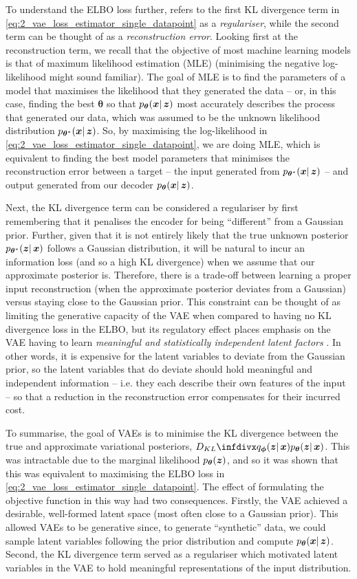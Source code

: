 To understand the ELBO loss further, \cite{variational_bayes} refers to the first KL divergence term in \eqref{eq:2_vae_loss_estimator_single_datapoint} as a \textit{regulariser}, while the second term can be thought of as a \textit{reconstruction error}. Looking first at the reconstruction term, we recall that the objective of most machine learning models is that of maximum likelihood estimation (MLE) (minimising the negative log-likelihood might sound familiar). The goal of MLE is to find the parameters of a model that maximises the likelihood that they generated the data -- or, in this case, finding the best $\boldsymbol{\theta}$ so that $p_{\boldsymbol{\theta}}(\boldsymbol{x} |\, \boldsymbol{z})$ most accurately describes the process that generated our data, which was assumed to be the unknown likelihood distribution $p_{\boldsymbol{\theta}^*}(\boldsymbol{x} |\, \boldsymbol{z})$. So, by maximising the log-likelihood in \eqref{eq:2_vae_loss_estimator_single_datapoint}, we are doing MLE, which is equivalent to finding the best model parameters that minimises the reconstruction error between a target -- the input generated from $p_{\boldsymbol{\theta}^*}(\boldsymbol{x} |\, \boldsymbol{z})$ -- and output generated from our decoder $p_{\boldsymbol{\theta}}(\boldsymbol{x} |\, \boldsymbol{z})$.

Next, the KL divergence term can be considered a regulariser by first remembering that it penalises the encoder for being ``different'' from a Gaussian prior. 
Further, given that it is not entirely likely that the true unknown posterior $p_{\boldsymbol{\theta}^*}(\boldsymbol{z} |\, \boldsymbol{x})$ follows a Gaussian distribution, it will be natural to incur an information loss (and so a high KL divergence) when we assume that our approximate posterior is.
Therefore, there is a trade-off between learning a proper input reconstruction (when the approximate posterior deviates from a Gaussian) versus staying close to the Gaussian prior. This constraint can be thought of as limiting the generative capacity of the VAE when compared to having no KL divergence loss in the ELBO, but its regulatory effect places emphasis on the VAE having to learn \textit{meaningful and statistically independent latent factors} \cite{betaVAEHiggins2017}. In other words, it is expensive for the latent variables to deviate from the Gaussian prior, so the latent variables that do deviate should hold meaningful and independent information -- i.e. they each describe their own features of the input -- so that a reduction in the reconstruction error compensates for their incurred cost.

To summarise, the goal of VAEs is to minimise the KL divergence between the true and approximate variational posteriors, $\DKL{\qzgivex}{\pzgivex}$. 
This was intractable due to the marginal likelihood $p_{\boldsymbol{\theta}}(\boldsymbol{z})$, and so it was shown that this was equivalent to maximising the ELBO loss in \eqref{eq:2_vae_loss_estimator_single_datapoint}. The effect of formulating the objective function in this way had two consequences. Firstly, the VAE achieved a desirable, well-formed latent space (most often close to a Gaussian prior). This allowed VAEs to be generative since, to generate ``synthetic'' data, we could sample latent variables following the prior distribution and compute $p_{\boldsymbol{\theta}}(\boldsymbol{x} |\, \boldsymbol{z})$. Second, the KL divergence term served as a regulariser which motivated latent variables in the VAE to hold meaningful representations of the input distribution.

